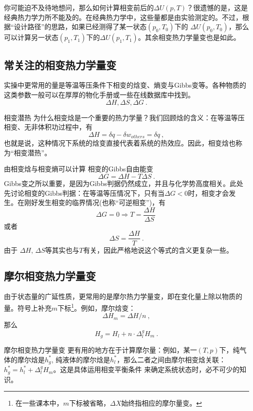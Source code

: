 你可能迫不及待地想问，那么如何计算相变前后的$\Delta U (p,T)$？很遗憾的是，这是经典热力学力所不能及的。在经典热力学中，这些量都是由实验测定的。不过，根据“设计路径”的思路，如果已经测得了某一状态$(p_0,T_0)$下的 $\Delta U (p_0,T_0)$，那么可以计算另一状态$(p_1,T_1)$下的$\Delta U (p_1,T_1)$。其余相变热力学量变也是如此。

\subsection{常关注的相变热力学量变}
实操中更常用的量是等温等压条件下相变的焓变、熵变与Gibbs变等。各种物质的这类参数一般可以在厚厚的物化手册或一些在线数据库中找到。
$$
\Delta H, \Delta  S, \Delta G~.
$$

\begin{example}{相变潜热}
为什么相变焓是一个重要的热力学量？我们回顾焓的含义：在等温等压相变、无非体积功过程中，有
$$
\Delta H = \delta q - \delta w_{others} = \delta q~,
$$
也就是说，这种情况下系统的焓变直接代表着系统的热效应。因此，相变焓也称为“相变潜热”。
\end{example}

由相变焓与相变熵可以计算 相变的Gibbs自由能变
$$
\Delta G = \Delta H - T \Delta S~.
$$
Gibbs变之所以重要，是因为Gibbs判据仍然成立，并且与化学势高度相关。此处先讨论相变的Gibbs判据：在等温等压情况下，只有当$\Delta G<0$时，相变才会发生。在刚好发生相变的临界情况(也称“可逆相变”)，有
$$
\Delta G = 0 \Rightarrow T = \frac{\Delta H}{\Delta S}~
$$
或者
$$
\Delta S = \frac{\Delta H}{T}~.
$$
由于 $\Delta H$, $\Delta S$等其实也与$T$有关，因此严格地说这个等式的含义更复杂一些。

\subsection{摩尔相变热力学量变}
由于状态量的广延性质，更常用的是摩尔热力学量变，即在变化量上除以物质的量。符号上补充$m$下标\footnote{在一些课本中，$m$下标被省略，$\Delta X$始终指相应的摩尔量变。}。例如，摩尔焓变：
$$
\Delta H_m = \Delta H / n~,
$$
那么
$$
H_g = H_l + n \cdot \Delta^g_l H_m~.
$$

摩尔相变热力学量变 更有用的地方在于计算摩尔量：例如，某一$(T,p)$下，纯气体的摩尔焓是$h^*_g$, 纯液体的摩尔焓是$h^*_l$，那么二者之间由摩尔相变焓关联：$h^*_g = h^*_l + \Delta^g_l H_m$。这是具体运用相变平衡条件 来确定系统状态时，必不可少的知识。


